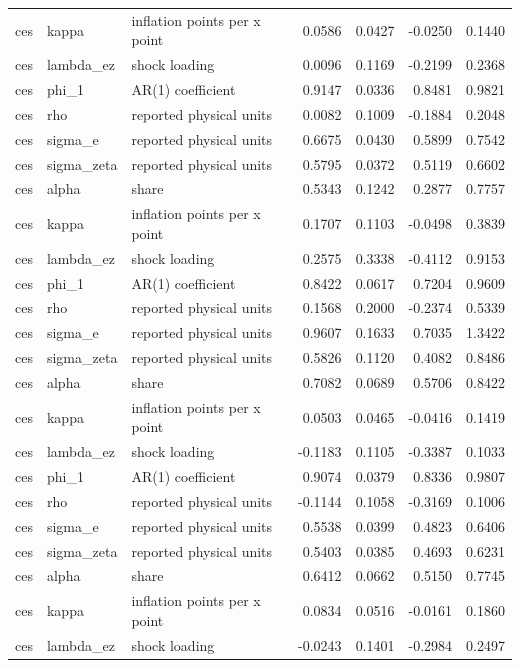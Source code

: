 \begin{tabular}{lllrrrr}
ces & kappa & inflation points per x point & 0.0586 & 0.0427 & -0.0250 & 0.1440 \\
ces & lambda\_ez & shock loading & 0.0096 & 0.1169 & -0.2199 & 0.2368 \\
ces & phi\_1 & AR(1) coefficient & 0.9147 & 0.0336 & 0.8481 & 0.9821 \\
ces & rho & reported physical units & 0.0082 & 0.1009 & -0.1884 & 0.2048 \\
ces & sigma\_e & reported physical units & 0.6675 & 0.0430 & 0.5899 & 0.7542 \\
ces & sigma\_zeta & reported physical units & 0.5795 & 0.0372 & 0.5119 & 0.6602 \\
ces & alpha & share & 0.5343 & 0.1242 & 0.2877 & 0.7757 \\
ces & kappa & inflation points per x point & 0.1707 & 0.1103 & -0.0498 & 0.3839 \\
ces & lambda\_ez & shock loading & 0.2575 & 0.3338 & -0.4112 & 0.9153 \\
ces & phi\_1 & AR(1) coefficient & 0.8422 & 0.0617 & 0.7204 & 0.9609 \\
ces & rho & reported physical units & 0.1568 & 0.2000 & -0.2374 & 0.5339 \\
ces & sigma\_e & reported physical units & 0.9607 & 0.1633 & 0.7035 & 1.3422 \\
ces & sigma\_zeta & reported physical units & 0.5826 & 0.1120 & 0.4082 & 0.8486 \\
ces & alpha & share & 0.7082 & 0.0689 & 0.5706 & 0.8422 \\
ces & kappa & inflation points per x point & 0.0503 & 0.0465 & -0.0416 & 0.1419 \\
ces & lambda\_ez & shock loading & -0.1183 & 0.1105 & -0.3387 & 0.1033 \\
ces & phi\_1 & AR(1) coefficient & 0.9074 & 0.0379 & 0.8336 & 0.9807 \\
ces & rho & reported physical units & -0.1144 & 0.1058 & -0.3169 & 0.1006 \\
ces & sigma\_e & reported physical units & 0.5538 & 0.0399 & 0.4823 & 0.6406 \\
ces & sigma\_zeta & reported physical units & 0.5403 & 0.0385 & 0.4693 & 0.6231 \\
ces & alpha & share & 0.6412 & 0.0662 & 0.5150 & 0.7745 \\
ces & kappa & inflation points per x point & 0.0834 & 0.0516 & -0.0161 & 0.1860 \\
ces & lambda\_ez & shock loading & -0.0243 & 0.1401 & -0.2984 & 0.2497 \\

\end{tabular}

